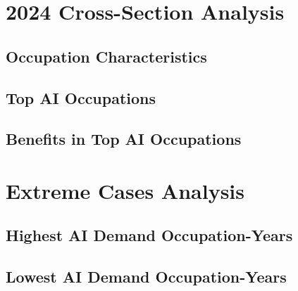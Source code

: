 \documentclass{article}
\begin{document}
\section{2024 Cross-Section Analysis}
\subsection{Occupation Characteristics}


\subsection{Top AI Occupations}


\subsection{Benefits in Top AI Occupations}


\section{Extreme Cases Analysis}
\subsection{Highest AI Demand Occupation-Years}


\subsection{Lowest AI Demand Occupation-Years}

\end{document}
